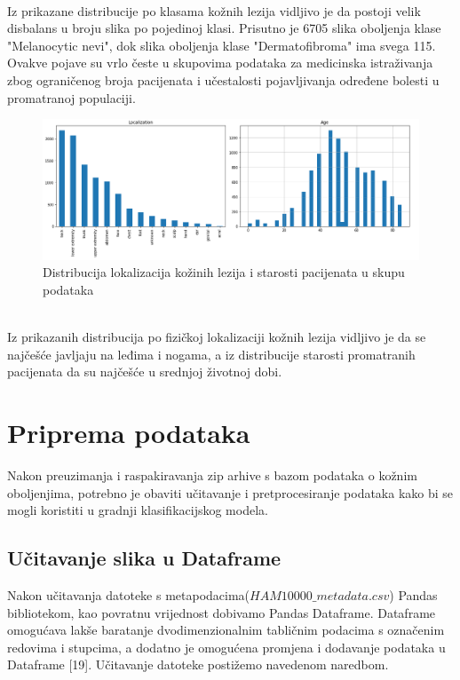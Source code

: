 \documentclass[times, utf8, zavrsni]{fer}
\begin{document}
\\
%
Iz prikazane distribucije po klasama kožnih lezija vidljivo je da postoji velik disbalans u broju slika po pojedinoj klasi. Prisutno je 6705 slika oboljenja klase "Melanocytic nevi", dok slika oboljenja klase "Dermatofibroma" ima svega 115. Ovakve pojave su vrlo česte u skupovima podataka za medicinska istraživanja zbog ograničenog broja pacijenata i učestalosti pojavljivanja određene bolesti u promatranoj populaciji.\\
%
\begin{figure}[!h]
\hspace{-0.1\textwidth}
\includegraphics[width=1.2\textwidth]{./slike/colab3}
\caption{Distribucija lokalizacija kožinih lezija i starosti pacijenata u skupu podataka}
\label{fig:colab3}
\end{figure}
%
\\
Iz prikazanih distribucija po fizičkoj lokalizaciji kožnih lezija vidljivo je da se najčešće javljaju na leđima i nogama, a iz distribucije starosti promatranih pacijenata da su najčešće u srednjoj životnoj dobi.

\section{Priprema podataka}


Nakon preuzimanja i raspakiravanja zip arhive s bazom podataka o kožnim oboljenjima, potrebno je obaviti učitavanje i pretprocesiranje podataka kako bi se mogli koristiti u gradnji klasifikacijskog modela.

\subsection*{Učitavanje slika u Dataframe}
Nakon učitavanja datoteke s metapodacima($HAM10000\_metadata.csv$) Pandas bibliotekom, kao povratnu vrijednost dobivamo Pandas Dataframe. Dataframe omogućava lakše baratanje dvodimenzionalnim tabličnim podacima s označenim redovima i stupcima, a dodatno je omogućena promjena i dodavanje podataka u Dataframe [19]. Učitavanje datoteke postižemo navedenom naredbom.
\end{document}
